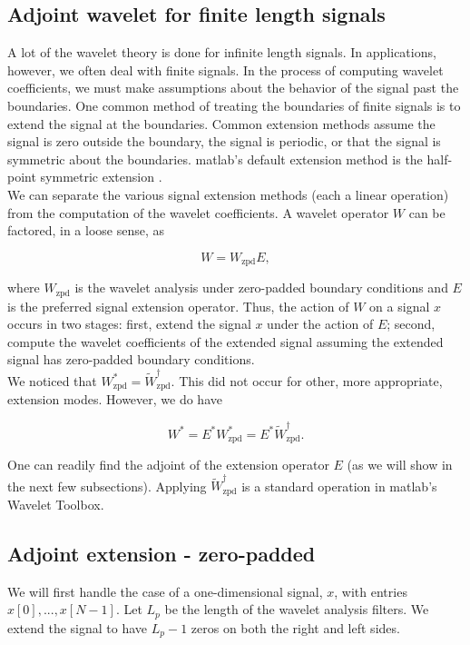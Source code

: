 \documentclass{article}
\theoremstyle{mystuff}
\theoremstyle{myexample}
\theoremstyle{named}
\begin{document}

\subsection{Adjoint wavelet for finite length signals}
A lot of the wavelet theory is done for infinite length signals.  In applications, however, we often deal with finite signals.  In the process of computing wavelet coefficients, we must make assumptions about the behavior of the signal past the boundaries.  One common method of treating the boundaries of finite signals is to extend the signal at the boundaries.  Common extension methods assume the signal is zero outside the boundary, the signal is periodic, or that the signal is symmetric about the boundaries.  {\sc matlab}'s default extension method is the half-point symmetric extension \cite{matlab_wt_2015, strang_1996}.\\

We can separate the various signal extension methods (each a linear operation) from the computation of the wavelet coefficients.  A wavelet operator $W$ can be factored, in a loose sense, as

\[ W = W_\text{zpd}E, \] 

\noindent where $W_\text{zpd}$ is the wavelet analysis under zero-padded boundary conditions and $E$ is the preferred signal extension operator.  Thus, the action of $W$ on a signal $x$ occurs in two stages: first, extend the signal $x$ under the action of $E$; second, compute the wavelet coefficients of the extended signal assuming the extended signal has zero-padded boundary conditions.\\

We noticed that $W^\ast_{\text{zpd}}=\widetilde{W}_{\text{zpd}}^\dagger$.  This did not occur for other, more appropriate, extension modes.  However, we do have

\[ W^\ast = E^\ast W^\ast_{\text{zpd}} = E^\ast \widetilde{W}^\dagger_\text{zpd}. \] 

\noindent One can readily find the adjoint of the extension operator $E$ (as we will show in the next few subsections).  Applying $\widetilde{W}^\dagger_\text{zpd}$ is a standard operation in {\sc matlab}'s Wavelet Toolbox.\\


\subsection{Adjoint extension - zero-padded}
We will first handle the case of a one-dimensional signal, $x$, with entries $x[0], ..., x[N-1]$.  Let $L_p$ be the length of the wavelet analysis filters.  We extend the signal to have $L_p-1$ zeros on both the right and left sides.
\end{document}
